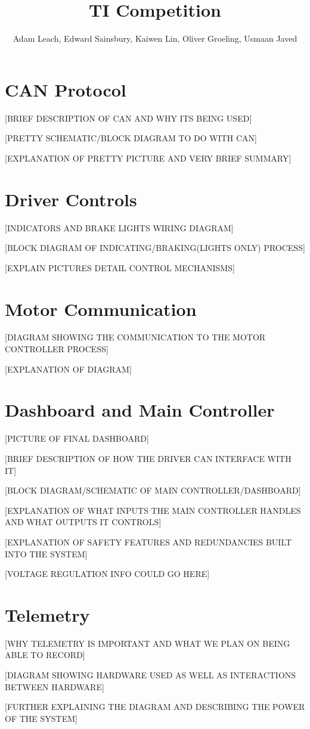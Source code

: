 \documentclass[10pt,a4paper]{article}
\begin{document}
\title{TI Competition}
\author{Adam Leach, Edward Sainsbury, Kaiwen Lin, Oliver Groeling, Usmaan Javed}
\maketitle
\tableofcontents
\section{CAN Protocol}
[BRIEF DESCRIPTION OF CAN AND WHY ITS BEING USED]

[PRETTY SCHEMATIC/BLOCK DIAGRAM TO DO WITH CAN]

[EXPLANATION OF PRETTY PICTURE AND VERY BRIEF SUMMARY]

\section{Driver Controls}
[INDICATORS AND BRAKE LIGHTS WIRING DIAGRAM]

[BLOCK DIAGRAM OF INDICATING/BRAKING(LIGHTS ONLY) PROCESS]

[EXPLAIN PICTURES DETAIL CONTROL MECHANISMS]

\section{Motor Communication}
[DIAGRAM SHOWING THE COMMUNICATION TO THE MOTOR CONTROLLER PROCESS]

[EXPLANATION OF DIAGRAM]

\section{Dashboard and Main Controller}
[PICTURE OF FINAL DASHBOARD]

[BRIEF DESCRIPTION OF HOW THE DRIVER CAN INTERFACE WITH IT]

[BLOCK DIAGRAM/SCHEMATIC OF MAIN CONTROLLER/DASHBOARD]

[EXPLANATION OF WHAT INPUTS THE MAIN CONTROLLER HANDLES AND WHAT OUTPUTS IT CONTROLS]

[EXPLANATION OF SAFETY FEATURES AND REDUNDANCIES BUILT INTO THE SYSTEM]

[VOLTAGE REGULATION INFO COULD GO HERE]

\section{Telemetry}
[WHY TELEMETRY IS IMPORTANT AND WHAT WE PLAN ON BEING ABLE TO RECORD]

[DIAGRAM SHOWING HARDWARE USED AS WELL AS INTERACTIONS BETWEEN HARDWARE]

[FURTHER EXPLAINING THE DIAGRAM AND DESCRIBING THE POWER OF THE SYSTEM]
\end{document}
